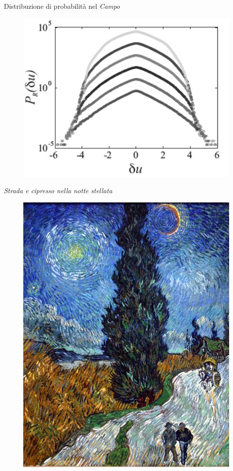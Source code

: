 \documentclass[11pt]{beamer}
\begin{document}
\begin{frame}{Distribuzione di probabilità nel \emph{Campo}}
\begin{figure}
\centering
\includegraphics[scale=0.4]{PDF_wheat.png}
\end{figure}
\end{frame}

\begin{frame}{\emph{Strada e cipresso nella notte stellata}}
\begin{figure}
\centering
\includegraphics[scale=0.08]{road_cypress.jpg}
\end{figure}
\end{frame}
\end{document}
